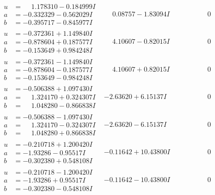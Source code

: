 \documentclass[1p]{elsarticle_modified}
\theoremstyle{definition}
\begin{document}
$$\begin{array}{c|c|c}
\begin{aligned}
u &= \phantom{-}1.178310 - 0.184999 I \\
a &= -0.332329 - 0.562029 I \\
b &= -0.395717 - 0.845977 I\end{aligned}
 & \phantom{-}0.08757 - 1.83094 I & \phantom{-0.000000 } 0 \\ \hline\begin{aligned}
u &= -0.372361 + 1.149840 I \\
a &= -0.878604 + 0.187577 I \\
b &= -0.153649 + 0.984248 I\end{aligned}
 & \phantom{-}4.10607 - 0.82015 I & \phantom{-0.000000 } 0 \\ \hline\begin{aligned}
u &= -0.372361 - 1.149840 I \\
a &= -0.878604 - 0.187577 I \\
b &= -0.153649 - 0.984248 I\end{aligned}
 & \phantom{-}4.10607 + 0.82015 I & \phantom{-0.000000 } 0 \\ \hline\begin{aligned}
u &= -0.506388 + 1.097430 I \\
a &= \phantom{-}1.324170 + 0.324307 I \\
b &= \phantom{-}1.048280 - 0.866838 I\end{aligned}
 & -2.63620 + 6.15137 I & \phantom{-0.000000 } 0 \\ \hline\begin{aligned}
u &= -0.506388 - 1.097430 I \\
a &= \phantom{-}1.324170 - 0.324307 I \\
b &= \phantom{-}1.048280 + 0.866838 I\end{aligned}
 & -2.63620 - 6.15137 I & \phantom{-0.000000 } 0 \\ \hline\begin{aligned}
u &= -0.210718 + 1.200420 I \\
a &= -1.93286 - 0.95517 I \\
b &= -0.302380 + 0.548108 I\end{aligned}
 & -0.11642 + 10.43800 I & \phantom{-0.000000 } 0 \\ \hline\begin{aligned}
u &= -0.210718 - 1.200420 I \\
a &= -1.93286 + 0.95517 I \\
b &= -0.302380 - 0.548108 I\end{aligned}
 & -0.11642 - 10.43800 I & \phantom{-0.000000 } 0 \\ \hline\begin{aligned}

\end{aligned}
\end{array}$$
\end{document}
